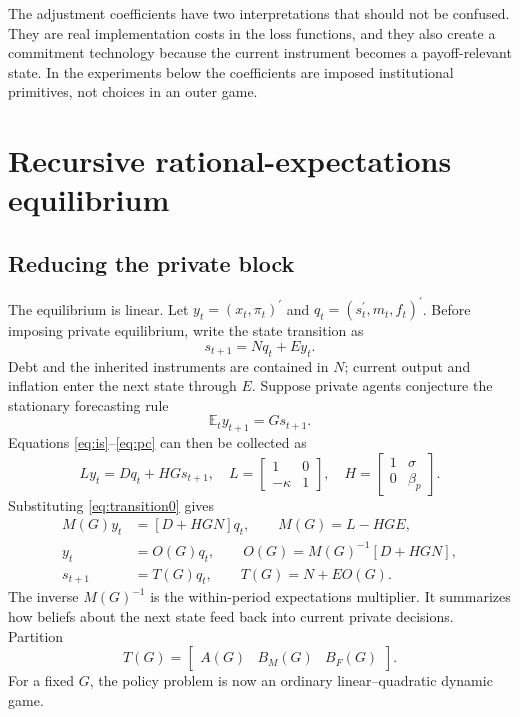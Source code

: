 \documentclass[11pt]{article}
\newcommand{\E}{\mathbb{E}}
\newcommand{\trans}{^{\prime}}
\begin{document}
The adjustment coefficients have two interpretations that should not be
confused. They are real implementation costs in the loss functions, and they
also create a commitment technology because the current instrument becomes a
payoff-relevant state. In the experiments below the coefficients are imposed
institutional primitives, not choices in an outer game.

\section{Recursive rational-expectations equilibrium}
\label{sec:solution}

\subsection{Reducing the private block}

The equilibrium is linear. Let $y_t=(x_t,\pi_t)\trans$ and
$q_t=(s_t\trans,m_t,f_t)\trans$. Before imposing private equilibrium, write
the state transition as
\begin{equation}
s_{t+1}=Nq_t+Ey_t.                                         \label{eq:transition0}
\end{equation}
Debt and the inherited instruments are contained in $N$; current output and
inflation enter the next state through $E$. Suppose private agents conjecture
the stationary forecasting rule
\begin{equation}
\E_t y_{t+1}=G s_{t+1}.                                    \label{eq:G}
\end{equation}
Equations \eqref{eq:is}--\eqref{eq:pc} can then be collected as
\begin{equation}
Ly_t=Dq_t+HG s_{t+1},
\quad
L=\begin{bmatrix}1&0\\-\kappa&1\end{bmatrix},
\quad
H=\begin{bmatrix}1&\sigma\\0&\beta_p\end{bmatrix}.       \label{eq:privatecompact}
\end{equation}
Substituting \eqref{eq:transition0} gives
\begin{align}
M(G)y_t&=[D+HGN]q_t,\qquad M(G)=L-HGE,                     \label{eq:M}\\
y_t&=O(G)q_t,\qquad O(G)=M(G)^{-1}[D+HGN],                 \label{eq:O}\\
s_{t+1}&=T(G)q_t,\qquad T(G)=N+EO(G).                      \label{eq:T}
\end{align}
The inverse $M(G)^{-1}$ is the within-period expectations multiplier. It
summarizes how beliefs about the next state feed back into current private
decisions. Partition
\begin{equation}
T(G)=\begin{bmatrix}A(G)&B_M(G)&B_F(G)\end{bmatrix}.
\end{equation}
For a fixed $G$, the policy problem is now an ordinary linear--quadratic
dynamic game.
\end{document}
